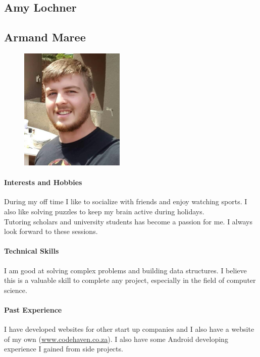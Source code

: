\documentclass[english]{article}
\begin{document}
		\subsection{Amy Lochner}
		
		\subsection{Armand Maree}
			\begin{figure}
				\begin{center}
					\includegraphics[width=5cm]{armand.jpg}
				\end{center}
			\end{figure}
			\paragraph{Interests and Hobbies}
			During my off time I like to socialize with friends and enjoy watching sports. I also like solving puzzles to keep my brain active during holidays.\\
			Tutoring scholars and university students has become a passion for me. I always look forward to these sessions.
			
			\paragraph{Technical Skills}
			I am good at solving complex problems and building data structures. I believe this is a valuable skill to complete any project, especially in the field of computer science.
			
			\paragraph{Past Experience}
			I have developed websites for other start up companies and I also have a website of my own (\href{http://www.codehaven.co.za}{www.codehaven.co.za}).
			I also have some Android developing experience I gained from side projects.
			
\end{document}
